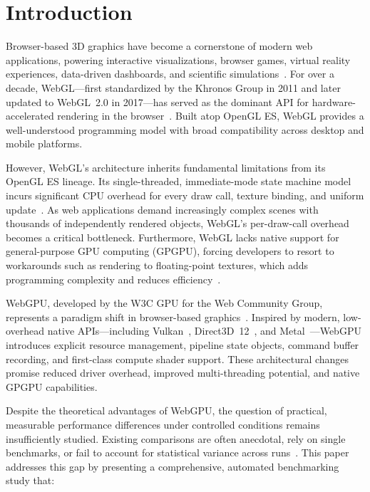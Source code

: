 \documentclass[conference]{IEEEtran}
\begin{document}
\section{Introduction}
\label{sec:introduction}

Browser-based 3D graphics have become a cornerstone of modern web applications, powering interactive visualizations, browser games, virtual reality experiences, data-driven dashboards, and scientific simulations~\cite{evans2014webgl, cabello2010threejs}. For over a decade, WebGL---first standardized by the Khronos Group in 2011 and later updated to WebGL~2.0 in 2017---has served as the dominant API for hardware-accelerated rendering in the browser~\cite{khronos2017webgl2}. Built atop OpenGL ES, WebGL provides a well-understood programming model with broad compatibility across desktop and mobile platforms.

However, WebGL's architecture inherits fundamental limitations from its OpenGL ES lineage. Its single-threaded, immediate-mode state machine model incurs significant CPU overhead for every draw call, texture binding, and uniform update~\cite{sellers2016vulkan}. As web applications demand increasingly complex scenes with thousands of independently rendered objects, WebGL's per-draw-call overhead becomes a critical bottleneck. Furthermore, WebGL lacks native support for general-purpose GPU computing (GPGPU), forcing developers to resort to workarounds such as rendering to floating-point textures, which adds programming complexity and reduces efficiency~\cite{cabello2010threejs}.

WebGPU, developed by the W3C GPU for the Web Community Group, represents a paradigm shift in browser-based graphics~\cite{w3c2024webgpu}. Inspired by modern, low-overhead native APIs---including Vulkan~\cite{sellers2016vulkan}, Direct3D~12~\cite{microsoft2015dx12}, and Metal~\cite{apple2014metal}---WebGPU introduces explicit resource management, pipeline state objects, command buffer recording, and first-class compute shader support. These architectural changes promise reduced driver overhead, improved multi-threading potential, and native GPGPU capabilities.

Despite the theoretical advantages of WebGPU, the question of practical, measurable performance differences under controlled conditions remains insufficiently studied. Existing comparisons are often anecdotal, rely on single benchmarks, or fail to account for statistical variance across runs~\cite{nickolls2010gpu}. This paper addresses this gap by presenting a comprehensive, automated benchmarking study that:
\end{document}

